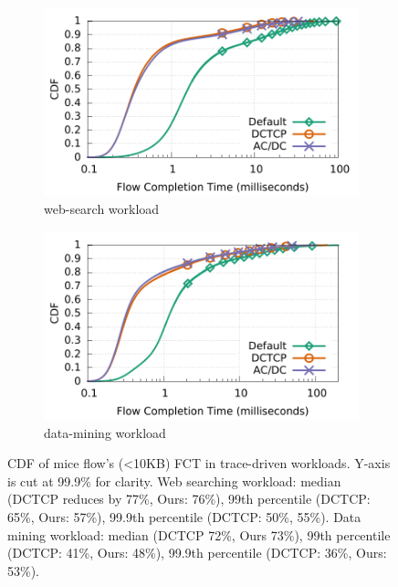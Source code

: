 \begin{figure}[t]
        \centering
        \begin{subfigure}[b]{0.45\textwidth}
                \centering
                \includegraphics[width=\textwidth]{figures/macro_benchmarks/trace-driven/trace_driven_workload_dctcp_senders5.pdf}
                \caption{web-search workload}
                \label{trace-driven-searching-fct}
        \end{subfigure}
        \begin{subfigure}[b]{0.45\textwidth}
                \centering
                \includegraphics[width=\textwidth]{figures/macro_benchmarks/trace-driven/trace_driven_workload_conga_senders5.pdf}
                \caption{data-mining workload}
                \label{trace-driven-data-mining-fct}
        \end{subfigure}
        \caption{CDF of mice flow's (<10KB) FCT in trace-driven workloads.
                Y-axis is cut at 99.9\% for clarity.
                Web searching workload: median (DCTCP reduces by 77\%, Ours: 76\%),
                99th percentile (DCTCP: 65\%, Ours: 57\%),
                99.9th percentile (DCTCP: 50\%, 55\%).
                Data mining workload: median (DCTCP 72\%, Ours 73\%),
                99th percentile (DCTCP: 41\%, Ours: 48\%),
                99.9th percentile (DCTCP: 36\%, Ours: 53\%).}
        \label{macro-trace-driven-fct}
\end{figure}




